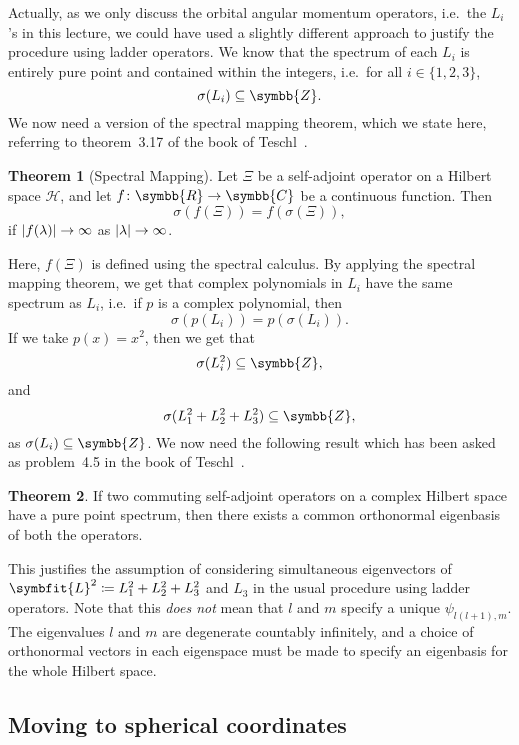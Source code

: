 \documentclass[12pt, a4 paper]{article}
\let\symcal\mathcal
\theoremstyle{definition}
\newtheorem{thm}{Theorem}
\newcommand{\rr}{\symbb{R}}
\newcommand{\cc}{\symbb{C}}
\newcommand{\zz}{\symbb{Z}}
\newcommand{\hilbert}{\symcal{H}}
\newcommand{\spec}{\sigma}
\DeclarePairedDelimiter{\abs}{\lvert}{\rvert}
\begin{document}
    Actually, as we only discuss the orbital angular momentum operators, i.e.\ the \(L_i\)'s in this lecture, we could have used a slightly different approach to justify the procedure using ladder operators. We know that the spectrum of each \(L_i\) is entirely pure point and contained within the integers, i.e.\ for all \(i \in \{1, 2, 3\}\),
    \[
        \spec(L_i) \subseteq \zz.
    \]
    We now need a version of the spectral mapping theorem, which we state here, referring to theorem~3.17 of the book of Teschl~\cite[p.~118]{Teschl}.
    \begin{thm}[Spectral Mapping]
        Let \(\Xi\) be a self-adjoint operator on a Hilbert space \(\hilbert\), and let \(f \colon \rr \rightarrow \cc\) be a continuous function. Then
        \[
            \spec(f(\Xi)) = f(\spec(\Xi)),
        \]
        if \(\abs{f(\lambda)} \rightarrow \infty\) as \(\abs{\lambda} \rightarrow \infty\).
    \end{thm}
    Here, \(f(\Xi)\) is defined using the spectral calculus. By applying the spectral mapping theorem, we get that complex polynomials in \(L_i\) have the same spectrum as \(L_i\), i.e.\ if \(p\) is a complex polynomial, then
    \[
        \spec(p(L_i)) = p(\spec(L_i)).
    \]
    If we take \(p(x) = x^2\), then we get that \[\spec(L_i^2) \subseteq \zz,\] and \[\spec(L_1^2 + L_2^2 + L_3^2) \subseteq \zz,\] as \(\spec(L_i) \subseteq \zz\). We now need the following result which has been asked as problem~4.5 in the book of Teschl~\cite[p.~138]{Teschl}.
    \begin{thm}
        If two commuting self-adjoint operators on a complex Hilbert space have a pure point spectrum, then there exists a common orthonormal eigenbasis of both the operators.
    \end{thm}
    This justifies the assumption of considering simultaneous eigenvectors of \(\symbfit{L}^2 \coloneq L_1^2 + L_2^2 + L_3^2\) and \(L_3\) in the usual procedure using ladder operators. Note that this \textit{does not} mean that \(l\) and \(m\) specify a unique \(\psi_{l(l+1), m}\). The eigenvalues \(l\) and \(m\) are degenerate countably infinitely, and a choice of orthonormal vectors in each eigenspace must be made to specify an eigenbasis for the whole Hilbert space.

    \subsection{Moving to spherical coordinates}
\end{document}
